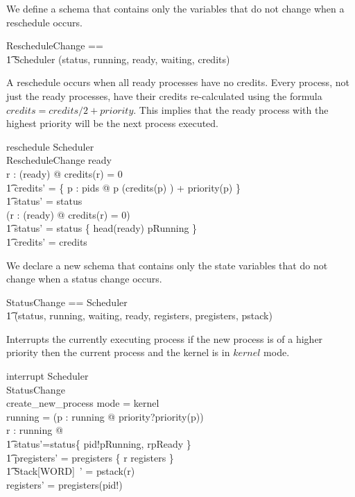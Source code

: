 \documentclass{article}
\begin{document}
We define a schema that contains only the variables that do not change
when a reschedule occurs.

\begin{zed}
  RescheduleChange == \\
    \t1 Scheduler \hide (status, running, ready, waiting, credits)
\end{zed}

A reschedule occurs when all ready processes have no credits. Every
process, not just the ready processes, have their credits
re-calculated using the formula $credits = credits/2 + priority$. This
implies that the ready process with the highest priority will be the
next process executed.

\begin{schema}{reschedule}
  \Delta Scheduler\\
  \Xi RescheduleChange
\where
  ready \neq \emptyset\\
  \forall r : \ran(ready) @ credits(r) = 0 \implies\\
    \t1 credits' =
      \{ p : pids @ p \mapsto (credits(p) ) + priority(p) \} \land\\
    \t1 status' = status\\
  \lnot (\forall r : \ran(ready) @ credits(r) = 0) \implies\\
    \t1 status' = status \oplus \{ head(ready) \mapsto pRunning \} \land\\ 
    \t1 credits' = credits
\end{schema}

We declare a new schema that contains only the state variables that do
not change when a status change occurs.

\begin{zed}
  StatusChange == Scheduler \hide\\
    \t1 (status, running, waiting, ready, registers, pregisters, pstack)
\end{zed}

Interrupts the currently executing process if the new process is of a
higher priority then the current process and the kernel is in $kernel$
mode.

\begin{schema}{interrupt}
  \Delta Scheduler\\
  \Xi StatusChange\\
  create\_new\_process
\where
  mode = kernel\\
  running = \emptyset\lor(\exists p : running @ priority?\geq priority(p))\\
  \exists r : running @\\
    \t1 status'=status\oplus\{ pid!\mapsto pRunning, r\mapsto pReady \}\land\\
    \t1 pregisters' = pregisters \oplus \{ r \mapsto registers \} \land\\
    \t1 \theta Stack[WORD]~' = pstack(r)\\
  registers' = pregisters(pid!)
\end{schema}
\end{document}
